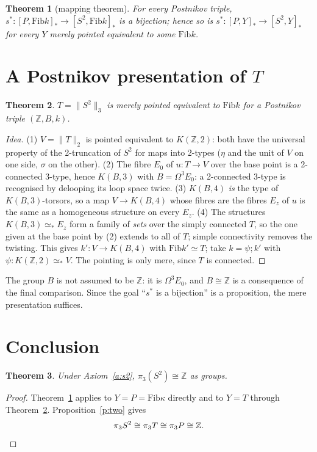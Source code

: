 \documentclass[11pt]{amsart}
\newtheorem{theorem}{Theorem}
\theoremstyle{definition}
\theoremstyle{remark}
\newcommand{\Om}{\Omega}
\newcommand{\Z}{\mathbb{Z}}
\newcommand{\hc}[2]{[#1,#2]_*}
\newcommand{\Fib}{\mathrm{Fib}}
\newcommand{\tr}[1]{\|#1\|}
\begin{document}
\begin{theorem}[mapping theorem]\label{t:main}
For every Postnikov triple, $s^*:\hc P{\Fib k}\to\hc{S^2}{\Fib k}$ is a bijection; hence
so is $s^*:\hc PY\to\hc{S^2}Y$ for every $Y$ merely pointed equivalent to some
$\Fib k$.
\end{theorem}

\section{A Postnikov presentation of $T$}

\begin{theorem}\label{t:pres}
$T=\tr{S^2}_3$ is merely pointed equivalent to $\Fib k$ for a Postnikov triple
$(\Z,B,k)$.
\end{theorem}
\begin{proof}[Idea]
(1) $V=\tr T_2$ is pointed equivalent to $K(\Z,2)$: both have the universal property of
the 2-truncation of $S^2$ for maps into 2-types ($\eta$ and the unit of $V$ on one side,
$\sigma$ on the other). (2) The fibre $E_0$ of $u:T\to V$ over the base point is a
2-connected 3-type, hence $K(B,3)$ with $B=\Om^3E_0$: a 2-connected 3-type is
recognised by delooping its loop space twice. (3) $K(B,4)$ \emph{is} the type of
$K(B,3)$-torsors, so a map $V\to K(B,4)$ whose fibres are the fibres $E_z$ of $u$ is the
same as a homogeneous structure on every $E_z$. (4) The structures $K(B,3)\simeq_*E_z$
form a family of \emph{sets} over the simply connected $T$, so the one given at the base
point by (2) extends to all of $T$; simple connectivity removes the twisting. This
gives $k':V\to K(B,4)$ with $\Fib k'\simeq T$; take $k=\psi;k'$ with
$\psi:K(\Z,2)\simeq_*V$. The pointing is only mere, since $T$ is connected.
\end{proof}

The group $B$ is not assumed to be $\Z$: it is $\Om^3E_0$, and $B\cong\Z$ is a
consequence of the final comparison. Since the goal ``$s^*$ is a bijection'' is a
proposition, the mere presentation suffices.

\section{Conclusion}

\begin{theorem}\label{t:final}
Under Axiom~\ref{a:s2}, $\pi_3(S^2)\cong\Z$ as groups.
\end{theorem}
\begin{proof}
Theorem~\ref{t:main} applies to $Y=P=\Fib\kappa$ directly and to $Y=T$ through
Theorem~\ref{t:pres}. Proposition~\ref{p:two} gives
\[\pi_3S^2\cong\pi_3T\cong\pi_3P\cong\Z.\qedhere\]
\end{proof}
\end{document}
